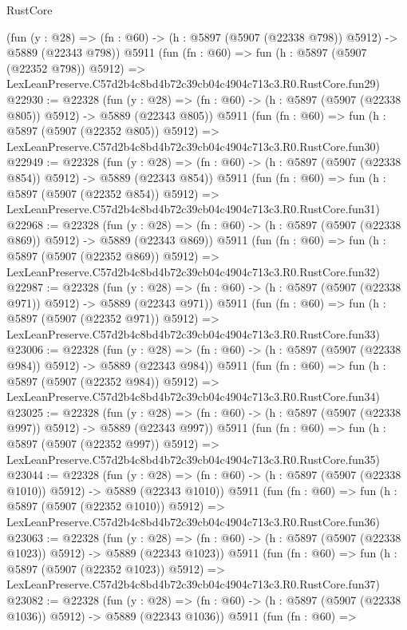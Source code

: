 \begin{lexlean}{RustCore}
\begin{coremodule}
    (fun (y : @28) => (fn : @60) -> (h : @5897 (@5907 (@22338 @798)) @5912) -> @5889 (@22343 @798))
    @5911
    (fun (fn : @60) =>
    fun (h : @5897 (@5907 (@22352 @798)) @5912) =>
    LexLeanPreserve.C57d2b4c8bd4b72c39cb04c4904c713c3.R0.RustCore.fun29)
@22930 := @22328
    (fun (y : @28) => (fn : @60) -> (h : @5897 (@5907 (@22338 @805)) @5912) -> @5889 (@22343 @805))
    @5911
    (fun (fn : @60) =>
    fun (h : @5897 (@5907 (@22352 @805)) @5912) =>
    LexLeanPreserve.C57d2b4c8bd4b72c39cb04c4904c713c3.R0.RustCore.fun30)
@22949 := @22328
    (fun (y : @28) => (fn : @60) -> (h : @5897 (@5907 (@22338 @854)) @5912) -> @5889 (@22343 @854))
    @5911
    (fun (fn : @60) =>
    fun (h : @5897 (@5907 (@22352 @854)) @5912) =>
    LexLeanPreserve.C57d2b4c8bd4b72c39cb04c4904c713c3.R0.RustCore.fun31)
@22968 := @22328
    (fun (y : @28) => (fn : @60) -> (h : @5897 (@5907 (@22338 @869)) @5912) -> @5889 (@22343 @869))
    @5911
    (fun (fn : @60) =>
    fun (h : @5897 (@5907 (@22352 @869)) @5912) =>
    LexLeanPreserve.C57d2b4c8bd4b72c39cb04c4904c713c3.R0.RustCore.fun32)
@22987 := @22328
    (fun (y : @28) => (fn : @60) -> (h : @5897 (@5907 (@22338 @971)) @5912) -> @5889 (@22343 @971))
    @5911
    (fun (fn : @60) =>
    fun (h : @5897 (@5907 (@22352 @971)) @5912) =>
    LexLeanPreserve.C57d2b4c8bd4b72c39cb04c4904c713c3.R0.RustCore.fun33)
@23006 := @22328
    (fun (y : @28) => (fn : @60) -> (h : @5897 (@5907 (@22338 @984)) @5912) -> @5889 (@22343 @984))
    @5911
    (fun (fn : @60) =>
    fun (h : @5897 (@5907 (@22352 @984)) @5912) =>
    LexLeanPreserve.C57d2b4c8bd4b72c39cb04c4904c713c3.R0.RustCore.fun34)
@23025 := @22328
    (fun (y : @28) => (fn : @60) -> (h : @5897 (@5907 (@22338 @997)) @5912) -> @5889 (@22343 @997))
    @5911
    (fun (fn : @60) =>
    fun (h : @5897 (@5907 (@22352 @997)) @5912) =>
    LexLeanPreserve.C57d2b4c8bd4b72c39cb04c4904c713c3.R0.RustCore.fun35)
@23044 := @22328
    (fun (y : @28) =>
    (fn : @60) -> (h : @5897 (@5907 (@22338 @1010)) @5912) -> @5889 (@22343 @1010))
    @5911
    (fun (fn : @60) =>
    fun (h : @5897 (@5907 (@22352 @1010)) @5912) =>
    LexLeanPreserve.C57d2b4c8bd4b72c39cb04c4904c713c3.R0.RustCore.fun36)
@23063 := @22328
    (fun (y : @28) =>
    (fn : @60) -> (h : @5897 (@5907 (@22338 @1023)) @5912) -> @5889 (@22343 @1023))
    @5911
    (fun (fn : @60) =>
    fun (h : @5897 (@5907 (@22352 @1023)) @5912) =>
    LexLeanPreserve.C57d2b4c8bd4b72c39cb04c4904c713c3.R0.RustCore.fun37)
@23082 := @22328
    (fun (y : @28) =>
    (fn : @60) -> (h : @5897 (@5907 (@22338 @1036)) @5912) -> @5889 (@22343 @1036))
    @5911
    (fun (fn : @60) =>

\end{coremodule}
\end{lexlean}
